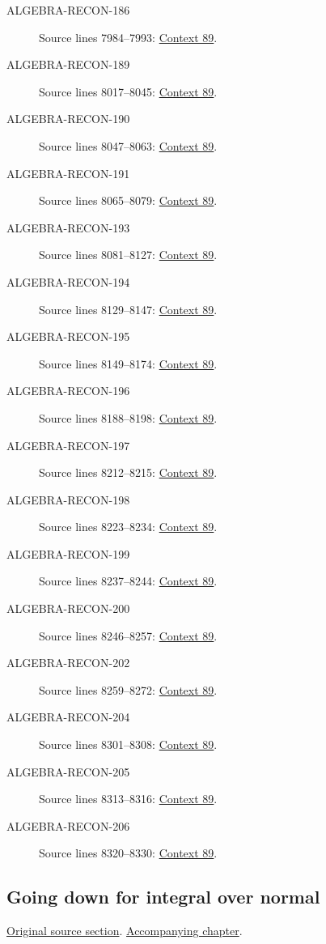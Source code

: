 \begin{description}
\item[ALGEBRA-RECON-186] Source lines 7984--7993: \hyperlink{algebra-context-089}{Context 89}.
\item[ALGEBRA-RECON-189] Source lines 8017--8045: \hyperlink{algebra-context-089}{Context 89}.
\item[ALGEBRA-RECON-190] Source lines 8047--8063: \hyperlink{algebra-context-089}{Context 89}.
\item[ALGEBRA-RECON-191] Source lines 8065--8079: \hyperlink{algebra-context-089}{Context 89}.
\item[ALGEBRA-RECON-193] Source lines 8081--8127: \hyperlink{algebra-context-089}{Context 89}.
\item[ALGEBRA-RECON-194] Source lines 8129--8147: \hyperlink{algebra-context-089}{Context 89}.
\item[ALGEBRA-RECON-195] Source lines 8149--8174: \hyperlink{algebra-context-089}{Context 89}.
\item[ALGEBRA-RECON-196] Source lines 8188--8198: \hyperlink{algebra-context-089}{Context 89}.
\item[ALGEBRA-RECON-197] Source lines 8212--8215: \hyperlink{algebra-context-089}{Context 89}.
\item[ALGEBRA-RECON-198] Source lines 8223--8234: \hyperlink{algebra-context-089}{Context 89}.
\item[ALGEBRA-RECON-199] Source lines 8237--8244: \hyperlink{algebra-context-089}{Context 89}.
\item[ALGEBRA-RECON-200] Source lines 8246--8257: \hyperlink{algebra-context-089}{Context 89}.
\item[ALGEBRA-RECON-202] Source lines 8259--8272: \hyperlink{algebra-context-089}{Context 89}.
\item[ALGEBRA-RECON-204] Source lines 8301--8308: \hyperlink{algebra-context-089}{Context 89}.
\item[ALGEBRA-RECON-205] Source lines 8313--8316: \hyperlink{algebra-context-089}{Context 89}.
\item[ALGEBRA-RECON-206] Source lines 8320--8330: \hyperlink{algebra-context-089}{Context 89}.
\end{description}

\subsection{Going down for integral over normal}
\hypertarget{algebra-source-section-going-down-integral-over-normal}{}
\noindent\href{https://github.com/stacks/stacks-project/blob/a04446e57ec1fbc252a871afcec7752fb2807b14/algebra.tex\#L8339}{Original source section}. \href{algebra.pdf\#nameddest=section-going-down-integral-over-normal}{Accompanying chapter}.

